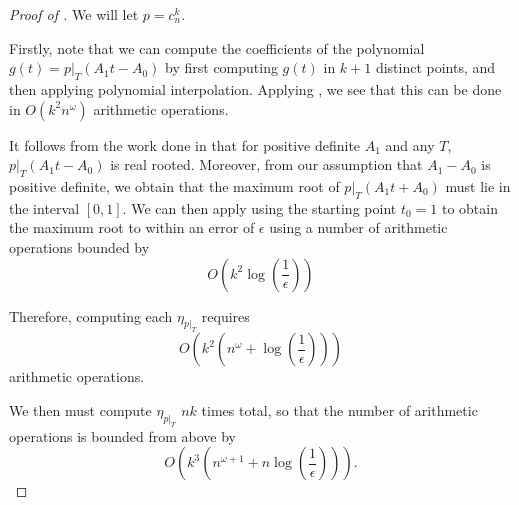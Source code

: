 \documentclass{amsart}
\theoremstyle{definition}
\begin{document}
\begin{proof}[Proof of ]
    We will let $p = c_n^k$.

    Firstly, note that we can compute the coefficients of the polynomial $g(t) = p|_T(A_1t - A_0)$ by first computing $g(t)$ in $k+1$ distinct points, and then applying polynomial interpolation.
    Applying , we see that this can be done in $O(k^2n^{\omega})$ arithmetic operations.

    It follows from the work done in \cite{blekherman2021linear} that for positive definite $A_1$ and any $T$, $p|_T(A_1t - A_0)$ is real rooted.
    Moreover, from our assumption that $A_1 - A_0$ is positive definite, we obtain that the maximum root of $p|_T(A_1t + A_0)$ must lie in the interval $[0,1]$.
    We can then apply  using the starting point $t_0 = 1$ to obtain the maximum root to within an error of $\epsilon$ using a number of arithmetic operations bounded by
    \[
        O(k^2\log(\frac{1}{\epsilon}))
    \]

    Therefore, computing each $\eta_{p|_T}$ requires
    \[
        O(k^2(n^{\omega} + \log(\frac{1}{\epsilon})))
    \]
    arithmetic operations.

    We then must compute $\eta_{p|_T}$ $nk$ times total, so that the number of arithmetic operations is bounded from above by
    \[
        O(k^3(n^{\omega+1} + n\log(\frac{1}{\epsilon}))).
    \]
\end{proof}
\end{document}
